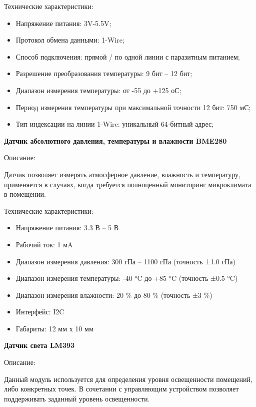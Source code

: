 Технические характеристики:

\begin{itemize}
    \itemsep0em
    \item Напряжение питания: 3V-5.5V;
    \item Протокол обмена данными: 1-Wire;
    \item Способ подключения: прямой / по одной линии с паразитным питанием;
    \item Разрешение преобразования температуры: 9 бит – 12 бит;
    \item Диапазон измерения температуры: от -55 до +125 оС;
    \item Период измерения температуры при максимальной точности 12 бит: 750 мС;
    \item Тип индексации на линии 1-Wire: уникальный 64-битный адрес;
\end{itemize}


\textbf{Датчик абсолютного давления, температуры и влажности BME280}

Описание:

Датчик позволяет измерять атмосферное давление, влажность и температуру, применяется в случаях, когда требуется полноценный мониторинг микроклимата в помещении.

Технические характеристики:

\begin{itemize}
    \itemsep0em
    \item Напряжение питания: 3.3 В – 5 В
    \item Рабочий ток: 1 мA
    \item Диапазон измерения давления: 300 гПа – 1100 гПа (точность ±1.0 гПа)
    \item Диапазон измерения температуры: -40 °C до +85 °C (точность ±0.5 °C)
    \item Диапазон измерения влажности: 20 \% до 80 \% (точность ±3 \%)
    \item Интерфейс: I2C
    \item Габариты: 12 мм х 10 мм
\end{itemize}


\textbf{Датчик света LM393}

Описание:

Данный модуль используется для определения уровня освещенности помещений, либо конкретных точек.
В сочетании с управляющим устройством позволяет поддерживать заданный уровень освещенности.

